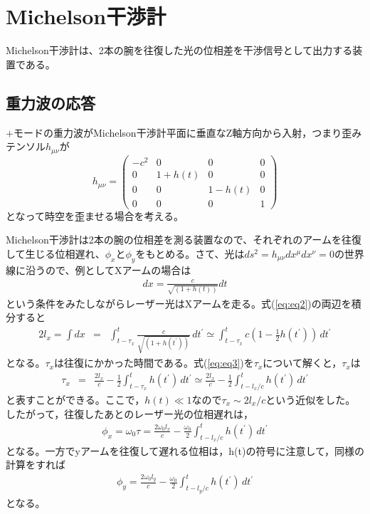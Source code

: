 \section{Michelson干渉計}

Michelson干渉計は、2本の腕を往復した光の位相差を干渉信号として出力する装置である。


\subsection{重力波の応答}
$+$モードの重力波がMichelson干渉計平面に垂直なZ軸方向から入射，つまり歪みテンソル$h_{\mu\nu}$が
\begin{equation}
  h_{\mu\nu} =
  \left(
  \begin{array}{cccc}
    -c^2 & 0      & 0      & 0 \\
    0   & 1+h(t) & 0      & 0 \\
    0   & 0      & 1-h(t) & 0 \\
    0   & 0      & 0      & 1 
  \end{array}
  \right)  
\end{equation}
となって時空を歪ませる場合を考える。

Michelson干渉計は2本の腕の位相差を測る装置なので、それぞれのアームを往復して生じる位相遅れ、$\phi_{x}$と$\phi_{y}$をもとめる。さて、光は$ds^2 = h_{\mu\nu}dx^{\mu}dx^{\nu} = 0 $の世界線に沿うので、例としてXアームの場合は
\begin{eqnarray}\label{eq:eq2}
  dx = \frac{c}{\sqrt{(1+h(t))}}dt
\end{eqnarray}
という条件をみたしながらレーザー光はXアームを走る。式(\ref{eq:eq2})の両辺を積分すると
\begin{eqnarray}\label{eq:eq3}
{2l_x} = \int dx &=& \int_{t-\tau_{x}}^{t} \frac{c}{\sqrt{(1+h(t^{\prime}))}}\, dt^{\prime} \simeq \int_{t-\tau_{x}}^{t} c\left(1-\frac{1}{2}h(t^{\prime})\right) \,dt^{\prime}
\end{eqnarray}
となる。$\tau_x$は往復にかかった時間である。式(\ref{eq:eq3})を$\tau_x$について解くと，$\tau_x$は
\begin{eqnarray}\label{eq:eq4}
  \tau_{x} &=& \frac{2l_x}{c} - \frac{1}{2}\int_{t-\tau_{x}}^{t} h(t^{\prime})\, dt^{\prime} \simeq \frac{2l_x}{c} - \frac{1}{2}\int_{t-l_{x}/c}^{t} h(t^{\prime})\, dt^{\prime}  
\end{eqnarray}
と表すことができる。ここで，$h(t)\ll1$なので$\tau_{x}\sim 2l_x/c$という近似をした。
したがって，往復したあとのレーザー光の位相遅れは，
\begin{eqnarray}\label{eq:eq5}
  \phi_{x} = \omega_{0}\tau = \frac{2\omega_{0}l_x}{c} - \frac{\omega_{0}}{2}\int_{t-l_{x}/c}^{t} h(t^{\prime})\, dt^{\prime}  
\end{eqnarray}
となる。一方でyアームを往復して遅れる位相は，h(t)の符号に注意して，同様の計算をすれば
\begin{eqnarray}\label{eq:eq6}
  \phi_{y} =  \frac{2\omega_{0}l_y}{c} - \frac{\omega_{0}}{2}\int_{t-l_{y}/c}^{t} h(t^{\prime})\, dt^{\prime}  
\end{eqnarray}
となる。


